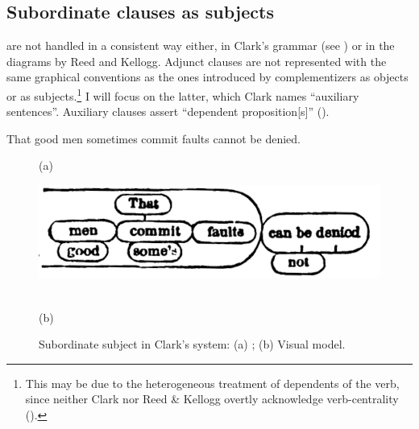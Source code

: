 \documentclass[english,output=paper,colorlinks,citecolor=brown]{../langscibook}
\begin{document}
\subsection{Subordinate clauses as subjects}\label{sec:4:4.3}

 are not handled in a consistent way either, in Clark’s grammar  (see \citealt[319--322 and 328--329]{Mazziotta2016}) or in the diagrams by Reed and Kellogg. Adjunct clauses are not represented with the same graphical conventions as the ones introduced by complementizers as objects or as subjects.\footnote{ \textrm{This may be due to the heterogeneous treatment of dependents of the verb, since neither Clark nor Reed \& Kellogg overtly acknowledge verb-centrality ().}} I will focus on the latter, which Clark names “auxiliary sentences”. Auxiliary clauses assert “dependent proposition[s]” (\citeyear[187]{Clark1870}).

\ea \label{ex:4:4} That good men sometimes commit faults cannot be denied. \z

\begin{figure}
     (a) \hspace{1em} \begin{minipage}[c]{.45\textwidth}\includegraphics[width=\textwidth]{figures/04/Clark3.png}\end{minipage}\medskip\\
     (b) \hspace{1em} 
    \caption{Subordinate subject in Clark’s system: (a) \citeyear[47]{Clark1870}; (b) Visual model.\label{fig:4:9}}
\end{figure}
 
\end{document}
